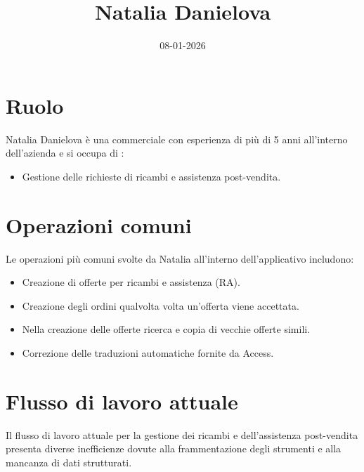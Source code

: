 \documentclass[12pt, a4paper]{article} %
\title{Natalia Danielova}
\date{08-01-2026}
\begin{document}
\maketitle

\section{Ruolo}
Natalia Danielova è una commerciale con esperienza di più di 5 anni all'interno
dell'azienda e si occupa di :
\begin{itemize}
      \item Gestione delle richieste di ricambi e assistenza post-vendita.
\end{itemize}

\section{Operazioni comuni}
Le operazioni più comuni svolte da Natalia all'interno dell'applicativo
includono:
\begin{itemize}
      \item Creazione di offerte per ricambi e assistenza (RA).
      \item Creazione degli ordini qualvolta volta un'offerta viene accettata.
      \item Nella creazione delle offerte ricerca e copia di vecchie offerte simili.
      \item Correzione delle traduzioni automatiche fornite da Access.
\end{itemize}

\section{Flusso di lavoro attuale}
Il flusso di lavoro attuale per la gestione dei ricambi e dell'assistenza
post-vendita presenta diverse inefficienze dovute alla frammentazione degli
strumenti e alla mancanza di dati strutturati.
\end{document}
